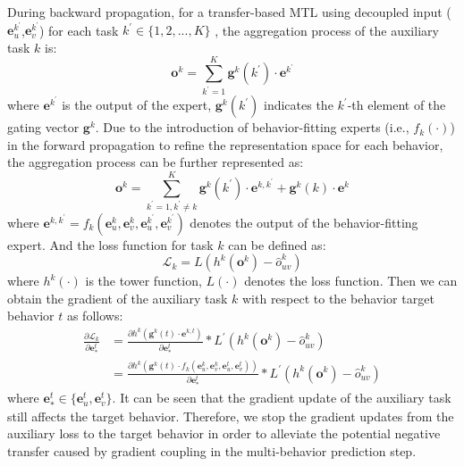 During backward propagation, for a transfer-based MTL using decoupled input ($\mathbf{e}_{u}^{k^{\prime}}$,$\mathbf{e}_{v}^{k^{\prime}}$) for each task $k^{\prime} \in \{1,2,...,K\}$ , the aggregation process of the auxiliary task $k$ is:
\begin{displaymath}
    \mathbf{o}^{k} = \sum_{k^{\prime}=1}^{K}\mathbf{g}^k(k^{\prime})\cdot\mathbf{e}^{k^{\prime}}
\end{displaymath}
where $\mathbf{e}^{k^{\prime}}$ is the output of the expert, $\mathbf{g}^k(k^{\prime})$ indicates the $k^{\prime}$-th element of the gating vector $\mathbf{g}^k$. Due to the introduction of behavior-fitting experts (i.e., $f_k(\cdot)$) in the forward propagation to refine the representation space for each behavior, the aggregation process can be further represented as:
\begin{displaymath}
    \mathbf{o}^k=\sum_{k^{\prime}=1,k^{\prime}\neq k}^K{\mathbf{g}^k(k^{\prime})\cdot\mathbf{e}^{k, k^{\prime}}}+\mathbf{g}^k(k)\cdot\mathbf{e}^{k}
\end{displaymath}
where $\mathbf{e}^{k, k^{\prime}}=f_k(\mathbf{e}_{u}^{k},\mathbf{e}_{v}^{k},\mathbf{e}_{u}^{k^{\prime}},\mathbf{e}_{v}^{k^{\prime}})$ denotes the output of the behavior-fitting expert. And the loss function for task $k$ can be defined as: 
\begin{displaymath}
\mathcal{L}_{k}=L(h^{k}(\mathbf{o}^{k})-\hat{o}_{uv}^{k})
\end{displaymath}
where $h^{k}(\cdot)$ is the tower function, $L(\cdot)$ denotes the loss function. Then we can obtain the gradient of the auxiliary task $k$ with respect to the behavior target behavior $t$ as follows: 
\begin{displaymath}
\begin{aligned}
{\frac{\partial \mathcal{L}_{k}}{\partial \mathbf{e}_{*}^t}}
&=\frac{\partial h^k(\mathbf{g}^k(t)\cdot \mathbf{e}^{k, t})}{\partial \mathbf{e}_{*}^t}*L^{\prime}(h^{k}(\mathbf{o}^k)-\hat{o}_{uv}^k) \\
&=\frac{\partial h^k(\mathbf{g}^k(t)\cdot f_k(\mathbf{e}_{u}^{k},\mathbf{e}_{v}^{k},\mathbf{e}_{u}^{t},\mathbf{e}_{v}^{t}))}{\partial \mathbf{e}_{*}^t}*L^{\prime}(h^{k}(\mathbf{o}^k)-\hat{o}_{uv}^k)
\end{aligned}
\end{displaymath}
where $\mathbf{e}_{*}^t \in \{\mathbf{e}_{u}^{t},\mathbf{e}_{v}^{t}\}$. It can be seen that the gradient update of the auxiliary task still affects the target behavior. Therefore, we stop the gradient updates from the auxiliary loss to the target behavior in order to alleviate the potential negative transfer caused by gradient coupling in the multi-behavior prediction step. 
